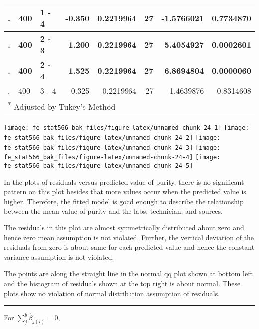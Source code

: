 \documentclass[12pt,]{article}
\begin{document}
\begin{table}[H]
\begin{tabular}{l|l|l|r|r|r|r|r}
\hline
. & 400 & 1 - 4 & -0.350 & 0.2219964 & 27 & -1.5766021 & 0.7734870\\
\hline
\rowcolor[HTML]{EAFAF1}  \textbf{.} & \textbf{400} & \textbf{2 - 3} & \textbf{1.200} & \textbf{0.2219964} & \textbf{27} & \textbf{5.4054927} & \textbf{0.0002601}\\
\hline
\rowcolor[HTML]{EAFAF1}  \textbf{.} & \textbf{400} & \textbf{2 - 4} & \textbf{1.525} & \textbf{0.2219964} & \textbf{27} & \textbf{6.8694804} & \textbf{0.0000060}\\
\hline
. & 400 & 3 - 4 & 0.325 & 0.2219964 & 27 & 1.4639876 & 0.8314608\\
\hline
\multicolumn{8}{l}{\textsuperscript{*} Adjusted by Tukey's Method}\\
\end{tabular}
\endgroup{}
\end{table}

\texttt{[image: fe\_stat566\_bak\_files/figure-latex/unnamed-chunk-24-1]}
\texttt{[image: fe\_stat566\_bak\_files/figure-latex/unnamed-chunk-24-2]}
\texttt{[image: fe\_stat566\_bak\_files/figure-latex/unnamed-chunk-24-3]}
\texttt{[image: fe\_stat566\_bak\_files/figure-latex/unnamed-chunk-24-4]}
\texttt{[image: fe\_stat566\_bak\_files/figure-latex/unnamed-chunk-24-5]}

In the plots of residuals versus predicted value of purity, there is no
significant pattern on this plot besides that more values occur when the
predicted value is higher. Therefore, the fitted model is good enough to
describe the relationship between the mean value of purity and the labs,
technician, and sources.

The residuals in this plot are almost symmetrically distributed about
zero and hence zero mean assumption is not violated. Further, the
vertical deviation of the residuals from zero is about same for each
predicted value and hence the constant variance assumption is not
violated.

The points are along the straight line in the normal qq plot shown at
bottom left and the histogram of residuals shown at the top right is
about normal. These plots show no violation of normal distribution
assumption of residuals.

\begin{center}\rule{0.5\linewidth}{\linethickness}\end{center}

For \(\sum_j^b\hat\beta_{j(i)}=0\),
\end{document}
